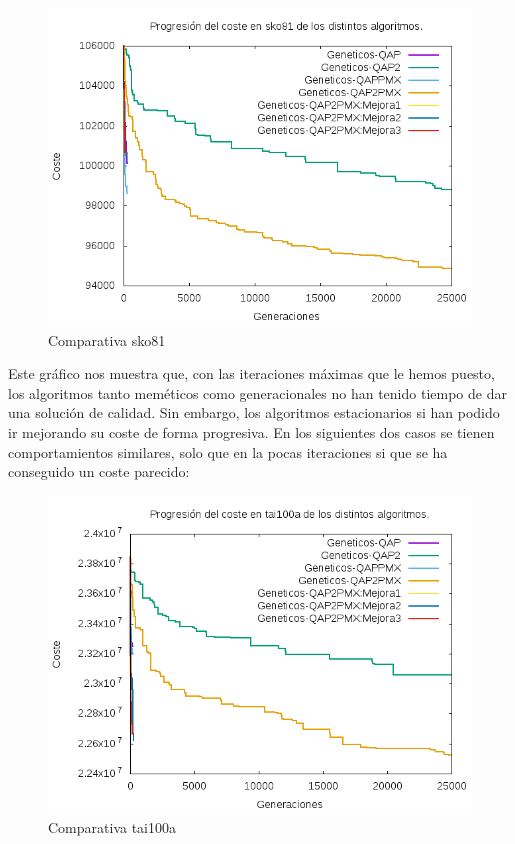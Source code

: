 \begin{figure}[H]
	\centering
	\includegraphics[width=0.7\linewidth]{graficos/comparativasko81}
	\caption[Comparativa sko81]{Comparativa sko81}
	\label{fig:comparativasko81}
\end{figure}

Este gráfico nos muestra que, con las iteraciones máximas que le hemos puesto, los algoritmos tanto meméticos como generacionales no han tenido tiempo de dar una solución de calidad. Sin embargo, los algoritmos estacionarios si han podido ir mejorando su coste de forma progresiva. En los siguientes dos casos se tienen comportamientos similares, solo que en la pocas iteraciones si que se ha conseguido un coste parecido:\\

\begin{figure}[H]
	\centering
	\includegraphics[width=0.7\linewidth]{graficos/comparativatai100a}
	\caption[Comparativa tai100a]{Comparativa tai100a}
	\label{fig:comparativatai100a}
\end{figure}

